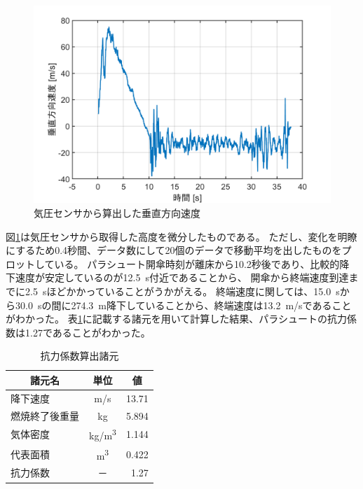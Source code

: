 \documentclass[a4paper,11pt,uplatex]{jsarticle}
\begin{document}
\begin{figure}[H]
	\centering
	\includegraphics[width=0.7\linewidth]{pic_sim/hight_d.png}
	\caption{気圧センサから算出した垂直方向速度}
	\label{fig:suityoku_kiatu}
\end{figure}

図\ref{fig:suityoku_kiatu}は気圧センサから取得した高度を微分したものである。
ただし、変化を明瞭にするため0.4秒間、データ数にして20個のデータで移動平均を出したものをプロットしている。
パラシュート開傘時刻が離床から10.2秒後であり、比較的降下速度が安定しているのが\SI{12.5}{s}付近であることから、
開傘から終端速度到達までに\SI{2.5}{s}ほどかかっていることがうかがえる。
終端速度に関しては、\SI{15.0}{s}から\SI{30.0}{s}の間に\SI{274.3}{m}降下していることから、終端速度は\SI{13.2}{m/s}であることがわかった。
表\ref{tab:kouryoku_shogen}に記載する諸元を用いて計算した結果、パラシュートの抗力係数は1.27であることがわかった。

\begin{table}[H]
	\centering
	\caption{抗力係数算出諸元}
	\label{tab:kouryoku_shogen}
	\begin{tabular}{lcr}
		\toprule
		\multicolumn{1}{c}{諸元名} & 単位          & \multicolumn{1}{c}{値} \\
		\midrule
		降下速度                    & \si{m/s}    & 13.71                 \\
		燃焼終了後重量                 & \si{kg}     & 5.894                 \\
		気体密度                    & \si{kg/m^3} & 1.144                 \\
		代表面積                    & \si{m^3}    & 0.422                 \\
		\midrule
		抗力係数                    & －           & 1.27                  \\
		\bottomrule
	\end{tabular}
\end{table}
\end{document}
